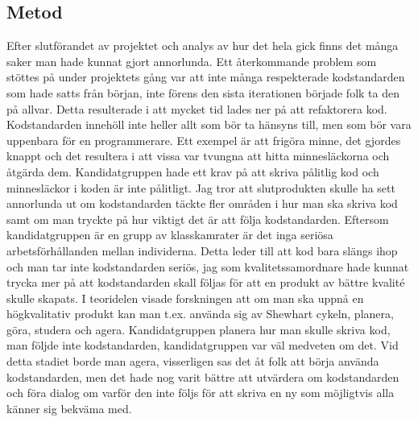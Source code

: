 \subsection{Metod}
Efter slutförandet av projektet och analys av hur det hela gick finns det många saker man hade kunnat gjort annorlunda. Ett återkommande problem som stöttes på under projektets gång var att inte många respekterade kodstandarden som hade satts från början, inte förens den sista iterationen började folk ta den på allvar. Detta resulterade i att mycket tid lades ner på att refaktorera kod. Kodstandarden innehöll inte heller allt som bör ta hänsyns till, men som bör vara uppenbara för en programmerare. Ett exempel är att frigöra minne, det gjordes knappt och det resultera i att vissa var tvungna att hitta minnesläckorna och åtgärda dem. Kandidatgruppen hade ett krav på att skriva pålitlig kod och minnesläckor i koden är inte pålitligt.
\newline
\newline
Jag tror att slutprodukten skulle ha sett annorlunda ut om kodstandarden täckte fler områden i hur man ska skriva kod samt om man tryckte på hur viktigt det är att följa kodstandarden. Eftersom kandidatgruppen är en grupp av klasskamrater är det inga seriösa arbetsförhållanden mellan individerna. Detta leder till att kod bara slängs ihop och man tar inte kodstandarden seriös, jag som kvalitetssamordnare hade kunnat trycka mer på att kodstandarden skall följas för att en produkt av bättre kvalité skulle skapats.
\newline
\newline
I teoridelen visade forskningen att om man ska uppnå en högkvalitativ produkt kan man t.ex. använda sig av Shewhart cykeln, planera, göra, studera och agera. Kandidatgruppen planera hur man skulle skriva kod, man följde inte kodstandarden, kandidatgruppen var väl medveten om det. Vid detta stadiet borde man agera, visserligen sas det åt folk att börja använda kodstandarden, men det hade nog varit bättre att utvärdera om kodstandarden och föra dialog om varför den inte följs för att skriva en ny som möjligtvis alla känner sig bekväma med.
